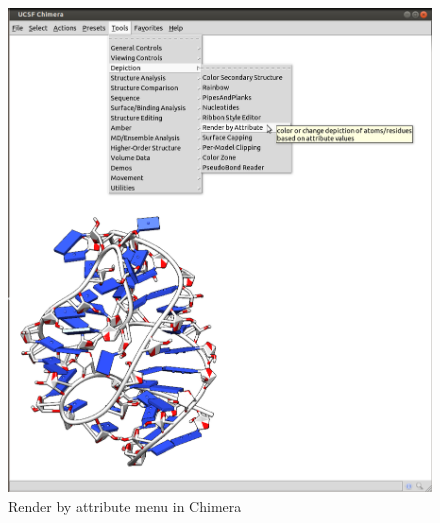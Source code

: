 \documentclass[12pt]{article}
\begin{document}
\begin{figure}[h!]
\centering
\includegraphics[scale=0.3]{./pictures/chimera1.png}
\caption{Render by attribute menu in Chimera}
\label{chimera1}
\end{figure}
\end{document}
